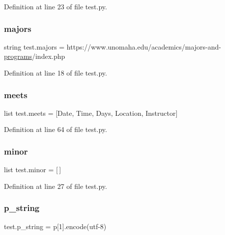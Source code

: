 Definition at line 23 of file test.\+py.

\mbox{\label{namespacetest_aac866171a3a2f476bc4ee9c246332d20}} 
\subsubsection{\texorpdfstring{majors}{majors}}
{\footnotesize\ttfamily string test.\+majors = \textquotesingle{}https\+://www.\+unomaha.\+edu/academics/majors-\/and-\/\mbox{\hyperlink{namespacetest_a41110e26af9a29431f856ff8e6e63389}{programs}}/index.\+php\textquotesingle{}}



Definition at line 18 of file test.\+py.

\mbox{\label{namespacetest_a091ffed22add46378587d16bdaa4ce6c}} 
\subsubsection{\texorpdfstring{meets}{meets}}
{\footnotesize\ttfamily list test.\+meets = \mbox{[}\textquotesingle{}Date\textquotesingle{}, \textquotesingle{}Time\textquotesingle{}, \textquotesingle{}Days\textquotesingle{}, \textquotesingle{}Location\textquotesingle{}, \textquotesingle{}Instructor\textquotesingle{}\mbox{]}}



Definition at line 64 of file test.\+py.

\mbox{\label{namespacetest_a6facd83236fb50c287bb03f98341bc17}} 
\subsubsection{\texorpdfstring{minor}{minor}}
{\footnotesize\ttfamily list test.\+minor = \mbox{[}$\,$\mbox{]}}



Definition at line 27 of file test.\+py.

\mbox{\label{namespacetest_a5c2a72e8bf34cbecb251dfb910bfecc6}} 
\subsubsection{\texorpdfstring{p\+\_\+string}{p\_string}}
{\footnotesize\ttfamily test.\+p\+\_\+string = p\mbox{[}1\mbox{]}.encode(\textquotesingle{}utf-\/8\textquotesingle{})}



